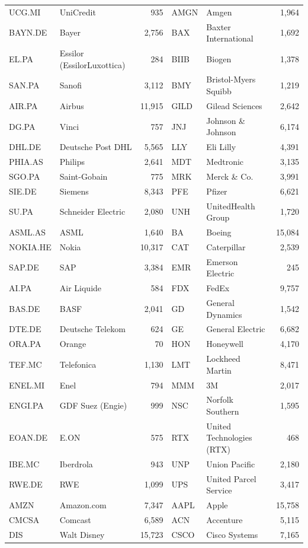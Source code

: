 \begin{tabular}{llrllr}
UCG.MI & UniCredit & 935 & AMGN & Amgen & 1,964 \\
BAYN.DE & Bayer & 2,756 & BAX & Baxter International & 1,692 \\
EL.PA & Essilor (EssilorLuxottica) & 284 & BIIB & Biogen & 1,378 \\
SAN.PA & Sanofi & 3,112 & BMY & Bristol-Myers Squibb & 1,219 \\
AIR.PA & Airbus & 11,915 & GILD & Gilead Sciences & 2,642 \\
DG.PA & Vinci & 757 & JNJ & Johnson \& Johnson & 6,174 \\
DHL.DE & Deutsche Post DHL & 5,565 & LLY & Eli Lilly & 4,391 \\
PHIA.AS & Philips & 2,641 & MDT & Medtronic & 3,135 \\
SGO.PA & Saint-Gobain & 775 & MRK & Merck \& Co. & 3,991 \\
SIE.DE & Siemens & 8,343 & PFE & Pfizer & 6,621 \\
SU.PA & Schneider Electric & 2,080 & UNH & UnitedHealth Group & 1,720 \\
ASML.AS & ASML & 1,640 & BA & Boeing & 15,084 \\
NOKIA.HE & Nokia & 10,317 & CAT & Caterpillar & 2,539 \\
SAP.DE & SAP & 3,384 & EMR & Emerson Electric & 245 \\
AI.PA & Air Liquide & 584 & FDX & FedEx & 9,757 \\
BAS.DE & BASF & 2,041 & GD & General Dynamics & 1,542 \\
DTE.DE & Deutsche Telekom & 624 & GE & General Electric & 6,682 \\
ORA.PA & Orange & 70 & HON & Honeywell & 4,170 \\
TEF.MC & Telefonica & 1,130 & LMT & Lockheed Martin & 8,471 \\
ENEL.MI & Enel & 794 & MMM & 3M & 2,017 \\
ENGI.PA & GDF Suez (Engie) & 999 & NSC & Norfolk Southern & 1,595 \\
EOAN.DE & E.ON & 575 & RTX & United Technologies (RTX) & 468 \\
IBE.MC & Iberdrola & 943 & UNP & Union Pacific & 2,180 \\
RWE.DE & RWE & 1,099 & UPS & United Parcel Service & 3,417 \\
AMZN & Amazon.com & 7,347 & AAPL & Apple & 15,758 \\
CMCSA & Comcast & 6,589 & ACN & Accenture & 5,115 \\
DIS & Walt Disney & 15,723 & CSCO & Cisco Systems & 7,165 \\

\end{tabular}

